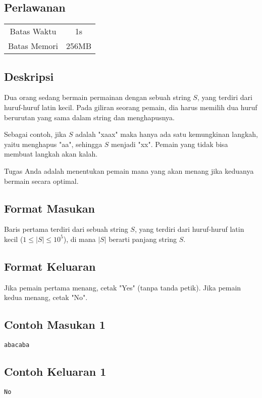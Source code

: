 \documentclass{article}
\begin{document}
\begin{center}

    
    \section*{Perlawanan} %

    \begin{tabular}{ | c c | }
        \hline
        Batas Waktu  & 1s \\    %
        Batas Memori & 256MB \\  %
        \hline
    \end{tabular}
\end{center}

\subsection*{Deskripsi}

Dua orang sedang bermain permainan dengan sebuah string $S$, yang terdiri dari huruf-huruf latin kecil. Pada giliran seorang pemain, dia harus memilih dua huruf berurutan yang sama dalam string dan menghapusnya.

Sebagai contoh, jika $S$ adalah "xaax" maka hanya ada satu kemungkinan langkah, yaitu menghapus "aa", sehingga $S$ menjadi "xx". Pemain yang tidak bisa membuat langkah akan kalah.

Tugas Anda adalah menentukan pemain mana yang akan menang jika keduanya bermain secara optimal.

\subsection*{Format Masukan}

Baris pertama terdiri dari sebuah string $S$, yang terdiri dari huruf-huruf latin kecil ($1 \leq |S| \leq 10^{5}$), di mana $|S|$ berarti panjang string $S$.

\subsection*{Format Keluaran}

Jika pemain pertama menang, cetak "Yes" (tanpa tanda petik). Jika pemain kedua menang, cetak "No".

\begin{multicols}{2}
\subsection*{Contoh Masukan 1}
\begin{lstlisting}
abacaba
\end{lstlisting}
\vfill
\null
\columnbreak
\subsection*{Contoh Keluaran 1}
\begin{lstlisting}
No
\end{lstlisting}
\vfill
\null
\end{multicols}
\end{document}
